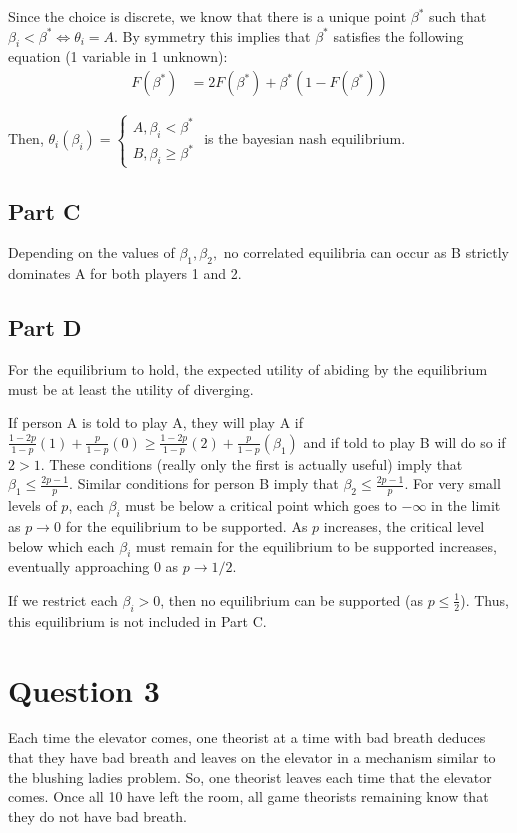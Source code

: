 \documentclass[11pt]{article} %
\begin{document}
Since the choice is discrete, we know that there is a unique point $\beta^{*}$ such that $\beta_i<\beta^{*}\iff\theta_i = A$. By symmetry this implies that $\beta^{*}$ satisfies the following equation (1 variable in 1 unknown):
\begin{align*}
F(\beta^{*})&=2F(\beta^{*}) + \beta^{*}(1-F(\beta^{*}))
\end{align*}

Then, $\theta_i(\beta_i) = \begin{cases} A, \beta_i<\beta^{*} \\ B, \beta_i\geq\beta^{*} \end{cases}$ is the bayesian nash equilibrium.
\subsection{Part C}
Depending on the values of $\beta_1,\beta_2,$ no correlated equilibria can occur as B strictly dominates A for both players 1 and 2. %
\subsection{Part D}
For the equilibrium to hold, the expected utility of abiding by the equilibrium must be at least the utility of diverging.

If person  A is told to play A, they will play A if $\frac{1-2p}{1-p}(1) + \frac{p}{1-p}(0)\geq \frac{1-2p}{1-p}(2) + \frac{p}{1-p}(\beta_1)$ and if told to play B will do so if $2>1$. These conditions (really only the first is actually useful) imply that $\beta_1 \leq \frac{2p-1}{p}$. Similar conditions for person B imply that $\beta_2 \leq \frac{2p-1}{p}$. For very small levels of $p$, each $\beta_i$ must be below a critical point which goes to $-\infty$ in the limit as $p\rightarrow 0$ for the equilibrium to be supported. As $p$ increases, the critical level below which each $\beta_i$ must  remain for the equilibrium to be supported increases, eventually approaching $0$ as $p\rightarrow 1/2$.

If we restrict each $\beta_i>0$, then no equilibrium can be supported (as $p\leq\frac{1}{2}$). Thus, this equilibrium is not included in Part C.
\section{Question 3}
Each time the elevator comes, one theorist at a time with bad breath deduces that they have bad breath and leaves on the elevator in a mechanism similar to the blushing ladies problem. So, one theorist leaves each time that the elevator comes. Once all 10 have left the room, all game theorists remaining know that they do not have bad breath.
\end{document}

